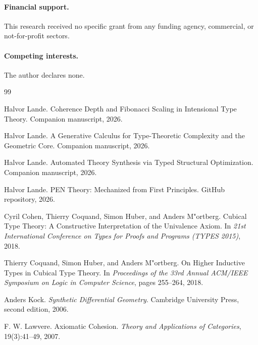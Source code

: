 \documentclass[11pt]{article}
\theoremstyle{plain}
\theoremstyle{definition}
\theoremstyle{remark}
\begin{document}
\paragraph{Financial support.}
This research received no specific grant from any funding agency, commercial, or not-for-profit sectors.

\paragraph{Competing interests.}
The author declares none.

\begin{thebibliography}{99}

Halvor Lande.
\newblock Coherence Depth and Fibonacci Scaling in Intensional Type Theory.
\newblock Companion manuscript, 2026.

Halvor Lande.
\newblock A Generative Calculus for Type-Theoretic Complexity and the Geometric Core.
\newblock Companion manuscript, 2026.

Halvor Lande.
\newblock Automated Theory Synthesis via Typed Structural Optimization.
\newblock Companion manuscript, 2026.

Halvor Lande.
\newblock PEN Theory: Mechanized from First Principles.
\newblock GitHub repository, 2026.

Cyril Cohen, Thierry Coquand, Simon Huber, and Anders M{"o}rtberg.
\newblock Cubical Type Theory: A Constructive Interpretation of the Univalence Axiom.
\newblock In \emph{21st International Conference on Types for Proofs and Programs (TYPES 2015)}, 2018.

Thierry Coquand, Simon Huber, and Anders M{"o}rtberg.
\newblock On Higher Inductive Types in Cubical Type Theory.
\newblock In \emph{Proceedings of the 33rd Annual ACM/IEEE Symposium on Logic in Computer Science}, pages 255--264, 2018.

Anders Kock.
\newblock \emph{Synthetic Differential Geometry}.
\newblock Cambridge University Press, second edition, 2006.

F. W. Lawvere.
\newblock Axiomatic Cohesion.
\newblock \emph{Theory and Applications of Categories}, 19(3):41--49, 2007.


\end{thebibliography}
\end{document}
